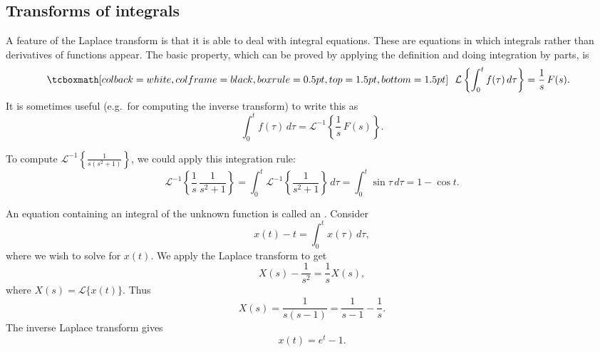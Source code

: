 \subsection{Transforms of integrals}

A feature of the Laplace transform is that it is able to deal
with integral equations.  These are equations in which integrals rather than
derivatives of functions appear.  The basic property, which can be proved
by applying the definition and doing integration by parts, is 
\begin{equation*}
\mybxbg{~~
\mathcal{L} \left\{
\int_0^t f(\tau) \, d\tau
\right\} = \frac{1}{s} \, F(s) .
~~}
\end{equation*}
It is sometimes useful (e.g.\ for computing the inverse transform) to write
this as
\begin{equation*}
\int_0^t f(\tau) \, d\tau
=
{\mathcal{L}}^{-1} \left\{
\frac{1}{s} \, F(s) \right\} .
\end{equation*}

\begin{example}
To compute ${\mathcal{L}}^{-1} \left\{\frac{1}{s(s^2+1)}\right\}$, we could
apply this integration rule:
\begin{equation*}
{\mathcal{L}}^{-1} \left\{
\frac{1}{s} \, \frac{1}{s^2+1} \right\} 
=
\int_0^t 
{\mathcal{L}}^{-1} \left\{
\frac{1}{s^2+1} \right\} \, d\tau
=
\int_0^t 
\sin \tau \, d\tau
=
1 - \cos t .
\end{equation*}
\end{example}


\begin{example}
An equation containing an integral of the unknown function is
called an \emph{}.
Consider
\begin{equation*}
x(t) - t = \int_0^t x(\tau) \, d\tau ,
\end{equation*}
where we wish to solve for $x(t)$.
We apply the Laplace transform to get
\begin{equation*}
X(s) - \frac{1}{s^2} = \frac{1}{s} X(s) ,
\end{equation*}
where $X(s) = \mathcal{L} \bigl\{ x(t) \bigr\}$.  Thus
\begin{equation*}
X(s) = \frac{1}{s(s-1)} = \frac{1}{s-1} - \frac{1}{s} .
\end{equation*}
The inverse Laplace transform gives
\begin{equation*}
x(t) = e^t - 1 .
\end{equation*}
\end{example}

